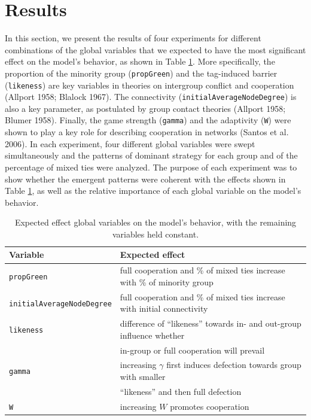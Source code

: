 \section{Results}
In this section, we present the results of four experiments for different combinations of the global variables that we expected to have the most significant effect on the model's behavior, as shown in Table \ref{tab:ExpectedEffect}. More specifically, the proportion of the minority group (\texttt{propGreen}) and the tag-induced barrier (\texttt{likeness}) are key variables in theories on intergroup conflict and cooperation (Allport 1958; Blalock 1967). The connectivity (\texttt{initialAverageNodeDegree}) is also a key parameter, as postulated by group contact theories (Allport 1958; Blumer 1958). Finally, the game strength (\texttt{gamma}) and the adaptivity (\texttt{W}) were shown to play a key role for describing cooperation in networks (Santos et al. 2006). In each experiment, four different global variables were swept simultaneously and the patterns of dominant strategy for each group and of the percentage of mixed ties were analyzed. The purpose of each experiment was to show whether the emergent patterns were coherent with the effects shown in Table \ref{tab:ExpectedEffect}, as well as the relative importance of each global variable on the model's behavior.   
\begin{table}[t!] \centering
	\small
	\begin{adjustbox}{width={\textwidth},totalheight={\textheight},keepaspectratio}%
	\begin{tabular}{ll}
		\hline
		\textbf{Variable} & \textbf{Expected effect}  \\
		\hline
		\rule{0pt}{0ex} \texttt{propGreen} & full cooperation and \% of mixed ties increase with \% of   minority group\\ 
		\rule{0pt}{4ex} \texttt{initialAverageNodeDegree}  & full cooperation and \% of mixed ties increase with initial  connectivity\\ 
		\rule{0pt}{4ex} \texttt{likeness}   & difference of ``likeness'' towards in- and out-group influence whether \\
		&  in-group or full cooperation will prevail  \\
		\rule{0pt}{4ex} \texttt{gamma}  & increasing $ \gamma $ first induces defection towards group with smaller  \\
		& ``likeness'' and then full defection \\ 
		\rule{0pt}{4ex} \texttt{W} & increasing $ W $ promotes cooperation\\
		\hline
	\end{tabular}
\end{adjustbox}
	\caption{Expected effect global variables on the model's behavior, with the remaining variables held constant.}
	
	\label{tab:ExpectedEffect}
\end{table}

